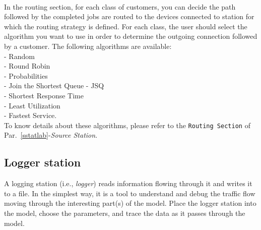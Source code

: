 \\ In the routing section, for
each class of customers, you can decide the path followed by the
completed jobs are routed to the devices connected to station for
which the routing strategy is defined.
For each class, the user should select the algorithm you want to
use in order to determine the outgoing connection followed by a
customer.
The following algorithms are available:\\
- Random\\ - Round Robin\\ - Probabilities\\ - Join the Shortest Queue - JSQ\\
- Shortest Response Time\\ - Least Utilization\\ - Fastest Service.\\
To know details about these algorithms, please refer to the
\texttt{Routing Section} of Par.~\ref{sstatlab}-\emph{Source
Station}.



\subsection{Logger station}
\label{logsta} A logging station (i.e., \emph{logger}) reads information
flowing through it and writes it to a file.   In the simplest way,
it is a tool to understand and debug the traffic flow moving
through the interesting part(s) of the model. Place the logger
station into the model, choose the parameters, and trace the data
as it passes through the model.\\

